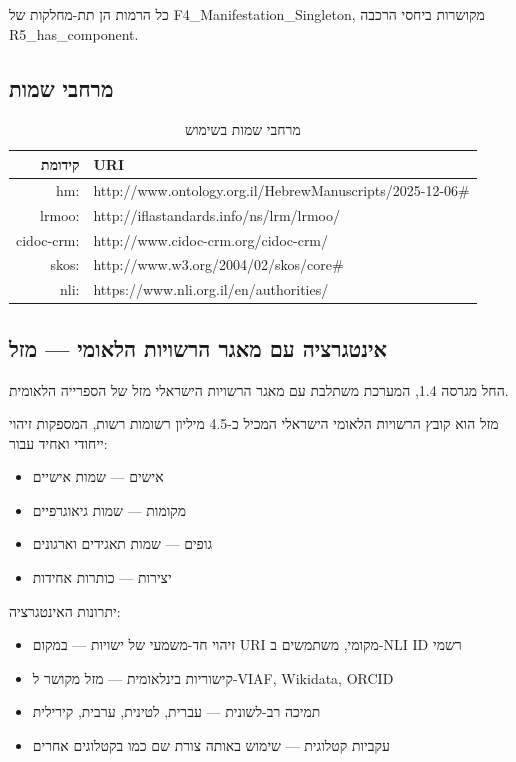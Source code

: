 \documentclass[12pt,a4paper]{article}
\newcommand{\en}[1]{\textenglish{\LR{#1}}}
\newcommand{\new}[1]{\textcolor{newaddition}{#1}}
\begin{document}
כל הרמות הן תת-מחלקות של \textenglish{F4\_Manifestation\_Singleton}, מקושרות ביחסי הרכבה \textenglish{R5\_has\_component}.

\subsection{מרחבי שמות \en{(Namespaces)}}

\begin{table}[h]
\centering
\begin{tabular}{|r|l|}
\hline
\textbf{קידומת} & \textbf{URI} \\
\hline
hm: & http://www.ontology.org.il/HebrewManuscripts/2025-12-06\# \\
lrmoo: & http://iflastandards.info/ns/lrm/lrmoo/ \\
cidoc-crm: & http://www.cidoc-crm.org/cidoc-crm/ \\
skos: & http://www.w3.org/2004/02/skos/core\# \\
\new{nli:} & \new{https://www.nli.org.il/en/authorities/} \\
\hline
\end{tabular}
\caption{מרחבי שמות בשימוש}
\end{table}

\subsection{\new{אינטגרציה עם מאגר הרשויות הלאומי — מזל}}

\new{החל מגרסה 1.4, המערכת משתלבת עם מאגר הרשויות הישראלי מזל \en{(Mazal)} של הספרייה הלאומית.}

\new{מזל הוא קובץ הרשויות הלאומי הישראלי המכיל כ-4.5 מיליון רשומות רשות, המספקות זיהוי ייחודי ואחיד עבור:}
\begin{itemize}
\item \new{אישים — שמות אישיים}
\item \new{מקומות — שמות גיאוגרפיים}
\item \new{גופים — שמות תאגידים וארגונים}
\item \new{יצירות — כותרות אחידות}
\end{itemize}

\new{יתרונות האינטגרציה:}
\begin{itemize}
\item \new{זיהוי חד-משמעי של ישויות — במקום URI מקומי, משתמשים ב-NLI ID רשמי}
\item \new{קישוריות בינלאומית — מזל מקושר ל-VIAF, Wikidata, ORCID}
\item \new{תמיכה רב-לשונית — עברית, לטינית, ערבית, קירילית}
\item \new{עקביות קטלוגית — שימוש באותה צורת שם כמו בקטלוגים אחרים}
\end{itemize}
\end{document}
